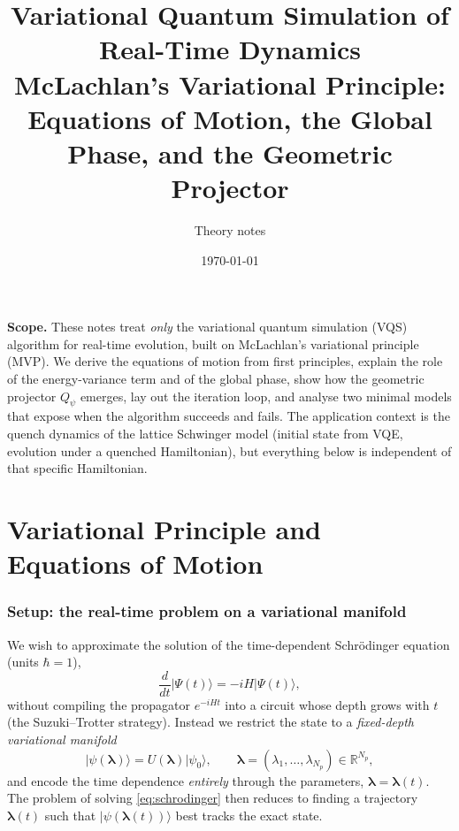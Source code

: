 \documentclass[12pt,a4paper]{article}
\title{\textbf{Variational Quantum Simulation of Real-Time Dynamics}\\[4pt]
\large McLachlan's Variational Principle: Equations of Motion, the Global Phase, and the Geometric Projector}
\author{Theory notes}
\date{\today}
\newcommand{\ket}[1]{\lvert #1 \rangle}
\begin{document}
\maketitle
\tableofcontents
\bigskip

\noindent\textbf{Scope.} These notes treat \emph{only} the variational quantum simulation (VQS)
algorithm for real-time evolution, built on McLachlan's variational principle (MVP). We derive
the equations of motion from first principles, explain the role of the energy-variance term and of
the global phase, show how the geometric projector $Q_\psi$ emerges, lay out the iteration loop,
and analyse two minimal models that expose when the algorithm succeeds and fails. The application
context is the quench dynamics of the lattice Schwinger model (initial state from VQE, evolution
under a quenched Hamiltonian), but everything below is independent of that specific Hamiltonian.

\newpage
\part{Variational Principle and Equations of Motion}

\section{Setup: the real-time problem on a variational manifold}\label{sec:setup}

We wish to approximate the solution of the time-dependent Schr\"odinger equation (units $\hbar=1$),
\begin{equation}
  \frac{d}{dt}\ket{\Psi(t)} = -iH\ket{\Psi(t)},
  \label{eq:schrodinger}
\end{equation}
without compiling the propagator $e^{-iHt}$ into a circuit whose depth grows with $t$ (the
Suzuki--Trotter strategy). Instead we restrict the state to a \emph{fixed-depth variational
manifold}
\begin{equation}
  \ket{\psi(\boldsymbol{\lambda})}=U(\boldsymbol{\lambda})\ket{\psi_0},
  \qquad \boldsymbol{\lambda}=(\lambda_1,\dots,\lambda_{N_p})\in\mathbb{R}^{N_p},
  \label{eq:ansatz}
\end{equation}
and encode the time dependence \emph{entirely} through the parameters, $\boldsymbol{\lambda}=\boldsymbol{\lambda}(t)$.
The problem of solving \eqref{eq:schrodinger} then reduces to finding a trajectory
$\boldsymbol{\lambda}(t)$ such that $\ket{\psi(\boldsymbol{\lambda}(t))}$ best tracks the exact state.
\end{document}
